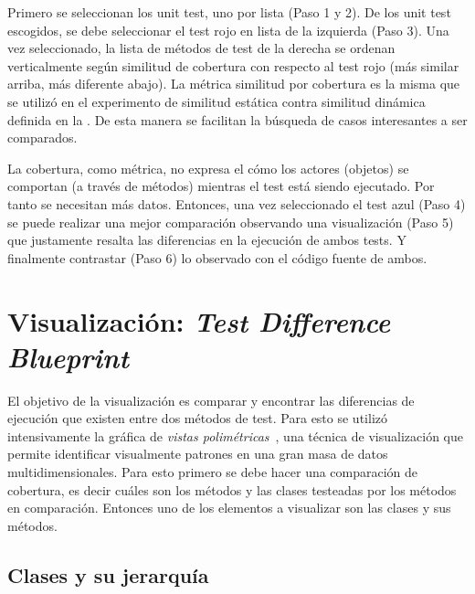 \par Primero se seleccionan los unit test, uno por lista (Paso 1 y 2). De los unit test escogidos, se debe seleccionar el test rojo en lista de la izquierda (Paso 3). Una vez seleccionado, la lista de métodos de test de la derecha se ordenan verticalmente según similitud de cobertura con respecto al test rojo (más similar arriba, más diferente abajo). La métrica similitud por cobertura es la misma que se utilizó en el experimento de similitud estática contra similitud dinámica definida en la . De esta manera se facilitan la búsqueda de casos interesantes a ser comparados. 

\par La cobertura, como métrica, no expresa el cómo los actores (objetos) se comportan (a través de métodos) mientras el test está siendo ejecutado. Por tanto se necesitan más datos. Entonces, una vez seleccionado el test azul (Paso 4) se puede realizar una mejor comparación observando una visualización (Paso 5) que justamente resalta las diferencias en la ejecución de ambos tests. Y finalmente contrastar (Paso 6) lo observado con el código fuente de ambos.



\section{Visualización: \emph{Test Difference Blueprint}}

\par El objetivo de la visualización es comparar y encontrar las diferencias de ejecución que existen entre dos métodos de test. Para esto se utilizó intensivamente la gráfica de \emph{vistas polimétricas}~\cite{Lanz03d}, una técnica de visualización que permite identificar visualmente patrones en una gran masa de datos multidimensionales. Para esto primero se debe hacer una comparación de cobertura, es decir cuáles son los métodos y las clases testeadas por los métodos en comparación. Entonces uno de los elementos a visualizar son las clases y sus métodos. 

\subsection{Clases y su jerarquía}


